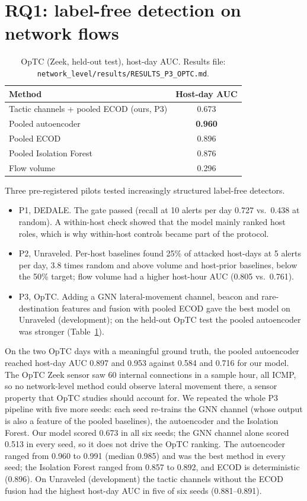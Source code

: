 \documentclass[acmlarge,screen,review]{acmart}
\begin{document}
\section{RQ1: label-free detection on network flows}\label{sec:rq1}
\begin{table}[!htbp]
\centering\small
\caption{OpTC (Zeek, held-out test), host-day AUC. Results file: \texttt{network\_level/results/RESULTS\_P3\_OPTC.md}.}
\label{tab:rq1}
\begin{tabular}{lc}
\toprule
Method & Host-day AUC \\
\midrule
Tactic channels + pooled ECOD (ours, P3) & 0.673 \\
Pooled autoencoder & \textbf{0.960} \\
Pooled ECOD & 0.896 \\
Pooled Isolation Forest & 0.876 \\
Flow volume & 0.296 \\
\bottomrule
\end{tabular}
\end{table}
Three pre-registered pilots tested increasingly structured label-free detectors.
\begin{itemize}
\item P1, DEDALE. The gate passed (recall at 10 alerts per day 0.727 vs.\ 0.438 at random). A within-host check
showed that the model mainly ranked host roles, which is why within-host controls became part of the protocol.
\item P2, Unraveled. Per-host baselines found 25\% of attacked host-days at 5 alerts per day, 3.8 times random and
above volume and host-prior baselines, below the 50\% target; flow volume had a higher host-hour AUC (0.805 vs.\
0.761).
\item P3, OpTC. Adding a GNN lateral-movement channel, beacon and rare-destination features and fusion with pooled
ECOD gave the best model on Unraveled (development); on the held-out OpTC test the pooled autoencoder was stronger
(Table~\ref{tab:rq1}).
\end{itemize}
On the two OpTC days with a meaningful ground truth, the pooled autoencoder reached host-day AUC 0.897 and 0.953
against 0.584 and 0.716 for our model. The OpTC Zeek sensor saw 60 internal connections in a sample hour, all ICMP,
so no network-level method could observe lateral movement there, a sensor property that OpTC studies should account for. We repeated the whole P3 pipeline with five more
seeds: each seed re-trains the GNN channel (whose output is also a feature of the pooled baselines), the autoencoder
and the Isolation Forest. Our model scored 0.673 in all six seeds; the GNN channel alone scored 0.513 in every seed, so
it does not drive the OpTC ranking. The autoencoder ranged from 0.960 to 0.991 (median 0.985) and was the best method in
every seed; the Isolation Forest ranged from 0.857 to 0.892, and ECOD is deterministic (0.896). On Unraveled
(development) the tactic channels without the ECOD fusion had the highest host-day AUC in five of six seeds
(0.881--0.891).
\end{document}
